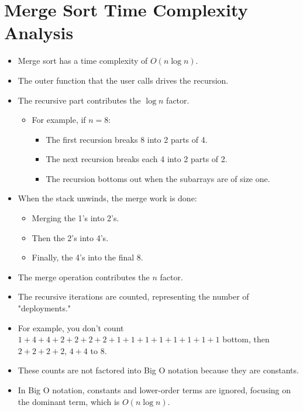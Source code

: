\documentclass{article}
\begin{document}
\section*{Merge Sort Time Complexity Analysis}

\begin{itemize}
    \item Merge sort has a time complexity of \(O(n \log n)\).
    \item The outer function that the user calls drives the recursion.
    \item The recursive part contributes the \(\log n\) factor.
    \begin{itemize}
        \item For example, if \(n = 8\):
        \begin{itemize}
            \item The first recursion breaks 8 into 2 parts of 4.
            \item The next recursion breaks each 4 into 2 parts of 2.
            \item The recursion bottoms out when the subarrays are of size one.
        \end{itemize}
    \end{itemize}
    \item When the stack unwinds, the merge work is done:
    \begin{itemize}
        \item Merging the 1's into 2's.
        \item Then the 2's into 4's.
        \item Finally, the 4's into the final 8.
    \end{itemize}
    \item The merge operation contributes the \(n\) factor.
    \item The recursive iterations are counted, representing the number of "deployments."
    \item For example, you don't count \(1 + 4 + 4 + 2 + 2 + 2 + 2 + 1 + 1 + 1 + 1 + 1 + 1 + 1 + 1\) bottom, then \(2 + 2 + 2 + 2\), \(4 + 4\) to 8.
    \item These counts are not factored into Big O notation because they are constants.
    \item In Big O notation, constants and lower-order terms are ignored, focusing on the dominant term, which is \(O(n \log n)\).
\end{itemize}
\end{document}
